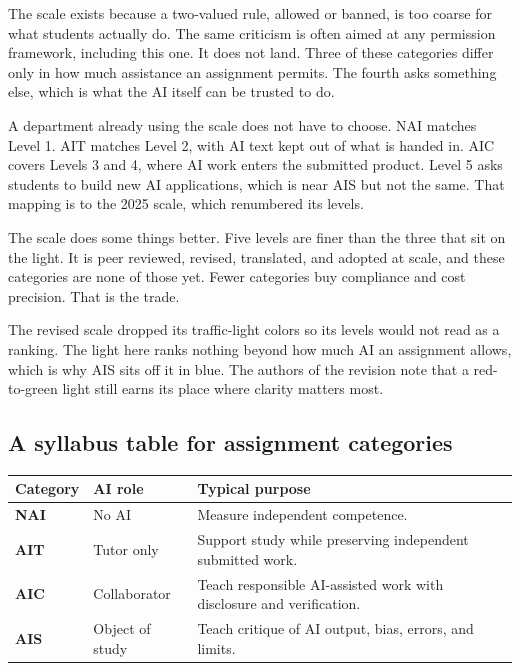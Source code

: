\documentclass{SIAMbook2023}
\newcommand{\NAI}{\textcolor{catNAI}{\textbf{NAI}}}
\newcommand{\AIT}{\textcolor{catAIT}{\textbf{AIT}}}
\newcommand{\AIC}{\textcolor{catAIC}{\textbf{AIC}}}
\newcommand{\AIS}{\textcolor{catAIS}{\textbf{AIS}}}
\begin{document}
The scale exists because a two-valued rule, allowed or banned, is too coarse for what students actually do. The same criticism is often aimed at any permission framework, including this one. It does not land. Three of these categories differ only in how much assistance an assignment permits. The fourth asks something else, which is what the AI itself can be trusted to do.

A department already using the scale does not have to choose. NAI matches Level 1. AIT matches Level 2, with AI text kept out of what is handed in. AIC covers Levels 3 and 4, where AI work enters the submitted product. Level 5 asks students to build new AI applications, which is near AIS but not the same. That mapping is to the 2025 scale, which renumbered its levels.

The scale does some things better. Five levels are finer than the three that sit on the light. It is peer reviewed, revised, translated, and adopted at scale, and these categories are none of those yet. Fewer categories buy compliance and cost precision. That is the trade.

The revised scale dropped its traffic-light colors so its levels would not read as a ranking. The light here ranks nothing beyond how much AI an assignment allows, which is why AIS sits off it in blue. The authors of the revision note that a red-to-green light still earns its place where clarity matters most.

\subsection{A syllabus table for assignment categories}
\label{i:subsec:category-table}

\begin{center}
\begin{tabular}{p{}p{}p{}}
\toprule
\textbf{Category} & \textbf{AI role} & \textbf{Typical purpose} \\
\midrule
\NAI{} & No AI & Measure independent competence. \\
\AIT{} & Tutor only & Support study while preserving independent submitted work. \\
\AIC{} & Collaborator & Teach responsible AI-assisted work with disclosure and verification. \\
\AIS{} & Object of study & Teach critique of AI output, bias, errors, and limits. \\
\bottomrule
\end{tabular}
\end{center}
\end{document}
